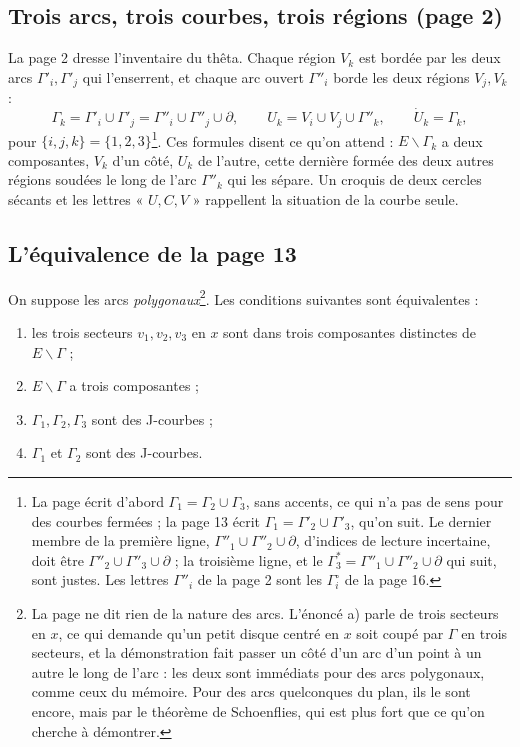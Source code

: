 \documentclass[11pt,a4paper]{article}
\begin{document}
\subsection*{Trois arcs, trois courbes, trois régions (page 2)}

La page 2 dresse l'inventaire du thêta. Chaque région $V_k$ est bordée par les
deux arcs $\Gamma'_i, \Gamma'_j$ qui l'enserrent, et chaque arc ouvert
$\Gamma''_i$ borde les deux régions $V_j, V_k$ :
\[
\Gamma_k = \Gamma'_i \cup \Gamma'_j = \Gamma''_i \cup \Gamma''_j \cup \partial,
\qquad
U_k = V_i \cup V_j \cup \Gamma''_k, \qquad \dot{U}_k = \Gamma_k ,
\]
pour $\{i, j, k\} = \{1, 2, 3\}$\footnote{La page écrit d'abord $\Gamma_1 =
\Gamma_2 \cup \Gamma_3$, sans accents, ce qui n'a pas de sens pour des courbes
fermées ; la page 13 écrit $\Gamma_1 = \Gamma'_2 \cup \Gamma'_3$, qu'on suit.
Le dernier membre de la première ligne, $\Gamma''_1 \cup \Gamma''_2 \cup
\partial$, d'indices de lecture incertaine, doit être $\Gamma''_2 \cup
\Gamma''_3 \cup \partial$ ; la troisième ligne, et le $\Gamma^{*}_3 =
\Gamma''_1 \cup \Gamma''_2 \cup \partial$ qui suit, sont justes. Les lettres
$\Gamma''_i$ de la page 2 sont les $\Gamma^{\circ}_i$ de la page 16.}. Ces
formules disent ce qu'on attend : $E \smallsetminus \Gamma_k$ a deux
composantes, $V_k$ d'un côté, $U_k$ de l'autre, cette dernière formée des deux
autres régions soudées le long de l'arc $\Gamma''_k$ qui les sépare. Un croquis
de deux cercles sécants et les lettres « $U, C, V$ » rappellent la situation
de la courbe seule.

\subsection*{L'équivalence de la page 13}

On suppose les arcs \emph{polygonaux}\footnote{La page ne dit rien de la
nature des arcs. L'énoncé a) parle de trois secteurs en $x$, ce qui demande
qu'un petit disque centré en $x$ soit coupé par $\Gamma$ en trois secteurs, et
la démonstration fait passer un côté d'un arc d'un point à un autre le long de
l'arc : les deux sont immédiats pour des arcs polygonaux, comme ceux du
mémoire. Pour des arcs quelconques du plan, ils le sont encore, mais par le
théorème de Schoenflies, qui est plus fort que ce qu'on cherche à démontrer.}.
Les conditions suivantes sont équivalentes :
\begin{enumerate}
  \item[a)] les trois secteurs $v_1, v_2, v_3$ en $x$ sont dans trois
    composantes distinctes de $E \smallsetminus \Gamma$ ;
  \item[a')] $E \smallsetminus \Gamma$ a trois composantes ;
  \item[b)] $\Gamma_1, \Gamma_2, \Gamma_3$ sont des J-courbes ;
  \item[c)] $\Gamma_1$ et $\Gamma_2$ sont des J-courbes.
\end{enumerate}
\end{document}
